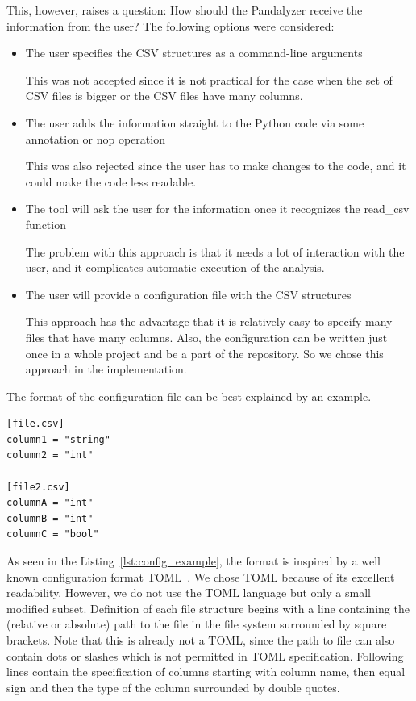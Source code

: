 This, however, raises a question: How should the Pandalyzer receive the information from the user?
The following options were considered:
\begin{itemize}
    \item The user specifies the CSV structures as a command-line arguments

    This was not accepted since it is not practical for the case when the set of CSV files is bigger or the CSV files
    have many columns.

    \item The user adds the information straight to the Python code via some annotation or nop operation

    This was also rejected since the user has to make changes to the code, and it could make the code less readable.

    \item The tool will ask the user for the information once it recognizes the read\_csv function

    The problem with this approach is that it needs a lot of interaction with the user, and it complicates automatic
    execution of the analysis.

    \item The user will provide a configuration file with the CSV structures

    This approach has the advantage that it is relatively easy to specify many files that have many columns.
    Also, the configuration can be written just once in a whole project and be a part of the repository.
    So we chose this approach in the implementation.
\end{itemize}

The format of the configuration file can be best explained by an example.

\begin{lstlisting}[caption=An example configuration file, label={lst:config_example}, captionpos=b]
[file.csv]
column1 = "string"
column2 = "int"

[file2.csv]
columnA = "int"
columnB = "int"
columnC = "bool"
\end{lstlisting}

As seen in the Listing~\ref{lst:config_example}, the format is inspired by a well known configuration format
TOML~\cite{toml_spec}.
We chose TOML because of its excellent readability.
However, we do not use the TOML language but only a small modified subset.
Definition of each file structure begins with a line containing the (relative or absolute) path to the file in the file
system surrounded by square brackets.
Note that this is already not a TOML, since the path to file can also contain dots or slashes which is not permitted in
TOML specification.
Following lines contain the specification of columns starting with column name, then equal sign and then the type of the
column surrounded by double quotes.

